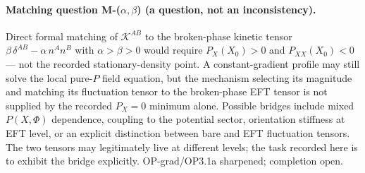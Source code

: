\paragraph{Matching question M-($\alpha,\beta$) (a question, not
an inconsistency).}
Direct formal matching of $\mathcal K^{AB}$ to the broken-phase
kinetic tensor $\beta\,\delta^{AB}-\alpha\,n^An^B$ with
$\alpha>\beta>0$ would require $P_X(X_0)>0$ and $P_{XX}(X_0)<0$
--- not the recorded stationary-density point.
A constant-gradient profile may still solve the local pure-$P$
field equation, but the mechanism selecting its magnitude and
matching its fluctuation tensor to the broken-phase EFT tensor is
not supplied by the recorded $P_X=0$ minimum alone.
Possible bridges include mixed $P(X,\Phi)$ dependence, coupling to
the potential sector, orientation stiffness at EFT level, or an
explicit distinction between bare and EFT fluctuation tensors.
The two tensors may legitimately live at different levels; the
task recorded here is to exhibit the bridge explicitly.
OP-grad/OP3.1a sharpened; completion open.

